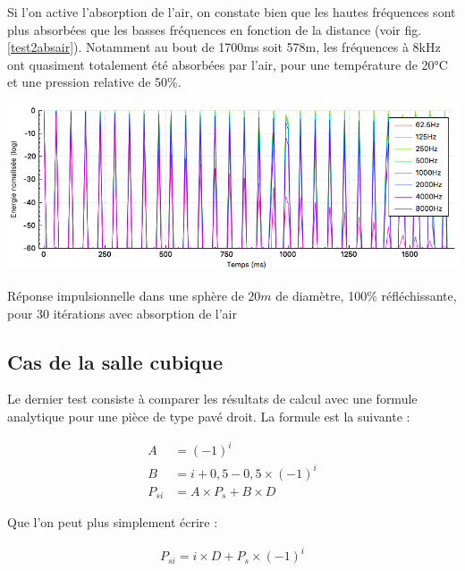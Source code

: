 Si l'on active l'absorption de l'air, on constate bien que les hautes fréquences sont plus absorbées que les basses fréquences en fonction de la distance (voir fig. \ref{test2absair}). Notamment au bout de 1700ms soit 578m, les fréquences à 8kHz ont quasiment totalement été absorbées par l'air, pour une température de 20°C et une pression relative de 50\%.


\begin{figureth}
	\includegraphics[width=\linewidth]{images/test2absair}
	\caption{Réponse impulsionnelle dans une sphère de $20m$ de diamètre, 100\% réfléchissante, pour 30 itérations avec absorption de l'air}
	\label{test2absair}
\end{figureth}

\subsection{Cas de la salle cubique}

Le dernier test consiste à comparer les résultats de calcul avec une formule analytique pour une pièce de type pavé droit. La formule \cite[p. 182-189]{mcgovern} est la suivante : 

\begin{align}
A &=  (-1)^i \\
B &= i + 0,5 - 0,5 \times (-1)^i \\
P_{si} &= A \times P_s + B \times D
\end{align}

Que l'on peut plus simplement écrire :

\begin{align}
P_{si} = i \times D + P_s \times (-1)^i
\end{align}

